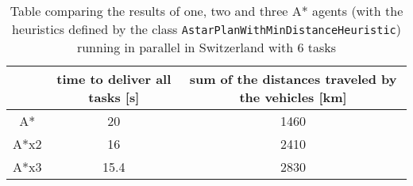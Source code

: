 \documentclass[11pt]{article}
\begin{document}
\begin{table}[h]
	\centering
	\begin{tabular}{ | c | c | c | } 
		\hline
		\qquad & time to deliver all tasks [s] & sum of the distances traveled by the vehicles [km]\\
		\hline
		A* & 20 & 1460 \\ 
		\hline
		A*x2 & 16 & 2410 \\
		\hline
		A*x3 & 15.4 & 2830 \\
		\hline
	\end{tabular}
	\caption{Table comparing the results of one, two and three A* agents (with the heuristics defined by the class \texttt{AstarPlanWithMinDistanceHeuristic}) running in parallel in Switzerland with 6 tasks}
	\label{table:2}
\end{table}
\end{document}
